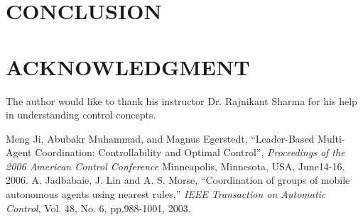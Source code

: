 \documentclass[letterpaper, 10 pt, conference]{ieeeconf}  %
\begin{document}

\section{CONCLUSION}
  

\addtolength{\textheight}{-12cm}   %








\section*{ACKNOWLEDGMENT}

The author would like to thank his instructor Dr. Rajnikant Sharma for his help in understanding control concepts.








\begin{thebibliography}{99}

 Meng Ji, Abubakr Muhammad, and Magnus Egerstedt, ``Leader-Based Multi-Agent Coordination: Controllability and Optimal Control'', \emph{Proceedings of the 2006 American Control Conference} Minneapolis, Minnesota, USA, June14-16, 2006.
 A.	Jadbabaie, J. Lin and A. S. Morse, ``Coordination of groups of mobile autonomous agents using nearest rules,'' \emph{IEEE Transaction on Automatic Control}, Vol. 48, No. 6, pp.988-1001, 2003.
 

\end{thebibliography}
\end{document}
